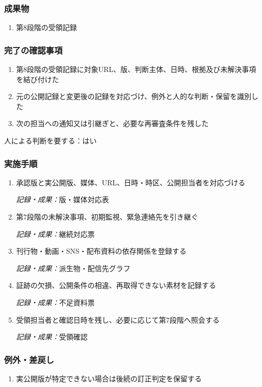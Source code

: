 \documentclass[a4paper,11pt]{article}
\begin{document}
\subsubsection*{成果物}
\begin{enumerate}[leftmargin=2em,itemsep=0.35em]
\item 第8段階の受領記録
\end{enumerate}
\subsubsection*{完了の確認事項}
\begin{enumerate}[leftmargin=2em,itemsep=0.35em]
\item 第8段階の受領記録に対象URL、版、判断主体、日時、根拠及び未解決事項を結び付けた
\item 元の公開記録と変更後の記録を対応づけ、例外と人的な判断・保留を識別した
\item 次の担当への通知又は引継ぎと、必要な再審査条件を残した
\end{enumerate}
\par 人による判断を要する：はい\par\medskip
\subsubsection*{実施手順}
\begin{enumerate}[leftmargin=2em,itemsep=0.65em]
\item 承認版と実公開版、媒体、URL、日時・時区、公開担当者を対応づける\par\noindent\textit{記録・成果：}版・媒体対応表\nobreak\smallskip
\item 第7段階の未解決事項、初期監視、緊急連絡先を引き継ぐ\par\noindent\textit{記録・成果：}継続対応票\nobreak\smallskip
\item 刊行物・動画・SNS・配布資料の依存関係を登録する\par\noindent\textit{記録・成果：}派生物・配信先グラフ\nobreak\smallskip
\item 証跡の欠損、公開条件の相違、再取得できない素材を記録する\par\noindent\textit{記録・成果：}不足資料票\nobreak\smallskip
\item 受領担当者と確認日時を残し、必要に応じて第7段階へ照会する\par\noindent\textit{記録・成果：}受領確認\nobreak\smallskip
\end{enumerate}
\subsubsection*{例外・差戻し}
\begin{enumerate}[leftmargin=2em,itemsep=0.35em]
\item 実公開版が特定できない場合は後続の訂正判定を保留する
\end{enumerate}
\end{document}
